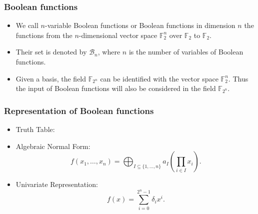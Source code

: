 \documentclass[
    aspectratio=169,                   %
]{beamer}
\newcommand{\F}{\mathbb{F}}
\newcommand{\Fn}{\mathbb{F}_{2^n}}
\newcommand{\Bn}{\mathcal{B}_n}
\begin{document}
    \begin{frame}
        \frametitle{Boolean functions}
        \begin{itemize}
            \item We call $ n $-variable Boolean functions or Boolean functions in dimension $ n $ the functions from 
            the $ n $-dimensional vector space $ \F_2^n $ over $ \F_2 $ to $ \F_2 $. 

            \item Their set is denoted by $ \Bn $, where $ n $ is the number of variables of Boolean functions.
            
            \item Given a basis, the field $ \Fn $ can be identified with the vector space $ \F_2^n $. 
            Thus the input of Boolean functions will also be considered in the field $ \Fn $.
        \end{itemize}

    \end{frame}

    \begin{frame}
        \frametitle{Representation of Boolean functions}
    
        \begin{itemize}
            \item Truth Table:
            \item Algebraic Normal Form: 
            \[f(x_1,\dots,x_n) = \bigoplus_{I\subseteq\{1,\dots,n\}}a_I\left(\prod_{i\in I}x_i \right).\]
            \item Univariate Representation: 
            \[f(x) = \sum_{i=0}^{2^n-1}\delta_ix^i.\]
        \end{itemize}
    
    \end{frame}
\end{document}
